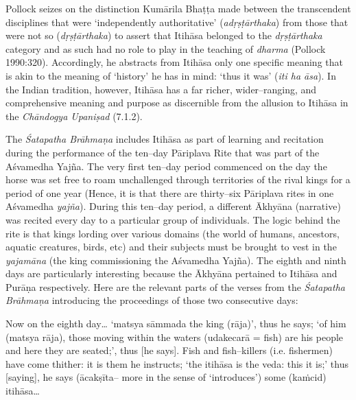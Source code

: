 Pollock seizes on the distinction Kumārila Bhaṭṭa made between the transcendent disciplines that were ‘independently authoritative’ (\textit{adṛṣṭārthaka}) from those that were not so (\textit{dṛṣṭārthaka}) to assert that Itihāsa belonged to the \textit{dṛṣṭārthaka} category and as such had no role to play in the teaching of \textit{dharma} (Pollock 1990:320). Accordingly, he abstracts from Itihāsa only one specific meaning that is akin to the meaning of ‘history’ he has in mind: ‘thus it was’ (\textit{iti ha āsa}). In the Indian tradition, however, Itihāsa has a far richer, wider–ranging, and comprehensive meaning and purpose as discernible from the allusion to Itihāsa in the \textit{Chāndogya Upaniṣad} (7.1.2). 

The \textit{Śatapatha Brāhmaṇa} includes Itihāsa as part of learning and recitation during the performance of the ten–day Pāriplava Rite that was part of the Aśvamedha Yajña. The very first ten–day period commenced on the day the horse was set free to roam unchallenged through territories of the rival kings for a period of one year (Hence, it is that there are thirty–six Pāriplava rites in one Aśvamedha \textit{yajña}). During this ten–day period, a different Ākhyāna (narrative) was recited every day to a particular group of individuals. The logic behind the rite is that kings lording over various domains (the world of humans, ancestors, aquatic creatures, birds, etc) and their subjects must be brought to vest in the \textit{yajamāna} (the king commissioning the Aśvamedha Yajña). The eighth and ninth days are particularly interesting because the Ākhyāna pertained to Itihāsa and Purāṇa respectively. Here are the relevant parts of the verses from the \textit{Śatapatha Brāhmaṇa}  introducing the proceedings of those two consecutive days:

\begin{myquote}
Now on the eighth day… ‘matsya sāmmada the king (rāja)’, thus he says; ‘of him (matsya rāja), those moving within the waters (udakecarā = fish) are his people and here they are seated;’, thus [he says]. Fish and fish–killers (i.e. fishermen) have come thither: it is them he instructs; ‘the itihāsa is the veda: this it is;’ thus [saying], he says (ācakṣīta– more in the sense of ‘introduces’) some (kaṁcid) itihāsa…
\end{myquote}


